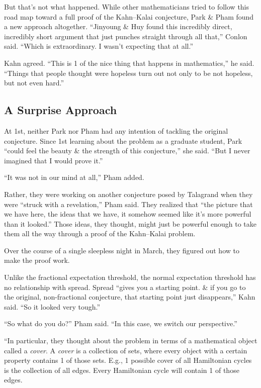 \documentclass[oneside]{book}
\numberwithin{equation}{section}
\begin{document}
But that's not what happened. While other mathematicians tried to follow this road map toward a full proof of the Kahn--Kalai conjecture, Park \& Pham found a new approach altogether. ``Jinyoung \& Huy found this incredibly direct, incredibly short argument that just punches straight through all that,'' Conlon said. ``Which is extraordinary. I wasn't expecting that at all.''

Kahn agreed. ``This is 1 of the nice thing that happens in mathematics,'' he said. ``Things that people thought were hopeless turn out not only to be not hopeless, but not even hard.''

\subsection{A Surprise Approach}
At 1st, neither Park nor Pham had any intention of tackling the original conjecture. Since 1st learning about the problem as a graduate student, Park ``could feel the beauty \& the strength of this conjecture,'' she said. ``But I never imagined that I would prove it.''

``It was not in our mind at all,'' Pham added.

Rather, they were working on another conjecture posed by Talagrand when they were ``struck with a revelation,'' Pham said. They realized that ``the picture that we have here, the ideas that we have, it somehow seemed like it's more powerful than it looked.'' Those ideas, they thought, might just be powerful enough to take them all the way through a proof of the Kahn--Kalai problem.

Over the course of a single sleepless night in March, they figured out how to make the proof work.

Unlike the fractional expectation threshold, the normal expectation threshold has no relationship with spread. Spread ``gives you a starting point. \& if you go to the original, non-fractional conjecture, that starting point just disappears,'' Kahn said. ``So it looked very tough.''

``So what do you do?'' Pham said. ``In this case, we switch our perspective.''

``In particular, they thought about the problem in terms of a mathematical object called a \textit{cover}. A \textit{cover} is a collection of sets, where every object with a certain property contains 1 of those sets. E.g., 1 possible cover of all Hamiltonian cycles is the collection of all edges. Every Hamiltonian cycle will contain 1 of those edges.
\end{document}
